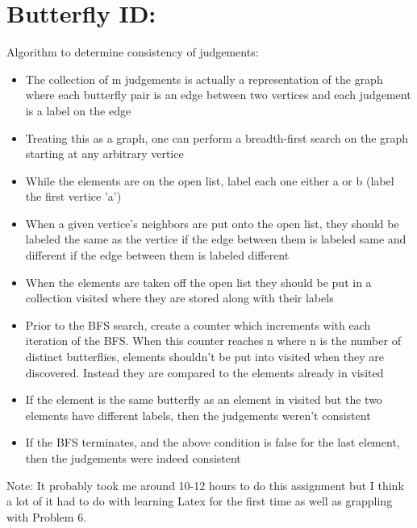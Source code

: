 \documentclass{article}
\begin{document}
\section{Butterfly ID:}
Algorithm to determine consistency of judgements:\\
\begin{itemize}
  \item The collection of m judgements is actually a representation of the graph where each butterfly pair is an edge between two vertices and each judgement is a label on the edge
  \item Treating this as a graph, one can perform a breadth-first search on the graph starting at any arbitrary vertice
  \item While the elements are on the open list, label each one either a or b (label the first vertice 'a')
  \item When a given vertice's neighbors are put onto the open list, they should be labeled the same as the vertice if the edge between them is labeled same and different if the edge between them is labeled different
  \item When the elements are taken off the open list they should be put in a collection visited where they are stored along with their labels
  \item Prior to the BFS search, create a counter which increments with each iteration of the BFS. When this counter reaches n where n is the number of distinct butterflies, elements shouldn't be put into visited when they are discovered. Instead they are compared to the elements already in visited
  \item If the element is the same butterfly as an element in visited but the two elements have different labels, then the judgements weren't consistent
  \item If the BFS terminates, and the above condition is false for the last element, then the judgements were indeed consistent
\end{itemize}

Note: It probably took me around 10-12 hours to do this assignment but I think a lot of it had to do with learning Latex for the first time as well as grappling with Problem 6.
\end{document}
